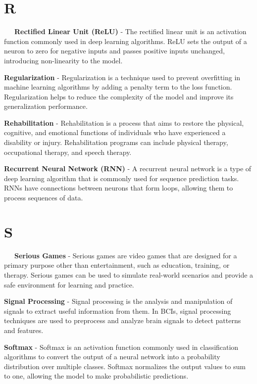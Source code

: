 \section*{R}

\-\ \-\ \-\ \textbf{Rectified Linear Unit (ReLU)} - The rectified linear unit is an activation function commonly used in deep learning algorithms. ReLU sets the output of a neuron to zero for negative inputs and passes positive inputs unchanged, introducing non-linearity to the model.

\textbf{Regularization} - Regularization is a technique used to prevent overfitting in machine learning algorithms by adding a penalty term to the loss function. Regularization helps to reduce the complexity of the model and improve its generalization performance.

\textbf{Rehabilitation} - Rehabilitation is a process that aims to restore the physical, cognitive, and emotional functions of individuals who have experienced a disability or injury. Rehabilitation programs can include physical therapy, occupational therapy, and speech therapy.

\textbf{Recurrent Neural Network (RNN)} - A recurrent neural network is a type of deep learning algorithm that is commonly used for sequence prediction tasks. RNNs have connections between neurons that form loops, allowing them to process sequences of data.

\section*{S}

\-\ \-\ \-\ \textbf{Serious Games} - Serious games are video games that are designed for a primary purpose other than entertainment, such as education, training, or therapy. Serious games can be used to simulate real-world scenarios and provide a safe environment for learning and practice.

\textbf{Signal Processing} - Signal processing is the analysis and manipulation of signals to extract useful information from them. In BCIs, signal processing techniques are used to preprocess and analyze brain signals to detect patterns and features.

\textbf{Softmax} - Softmax is an activation function commonly used in classification algorithms to convert the output of a neural network into a probability distribution over multiple classes. Softmax normalizes the output values to sum to one, allowing the model to make probabilistic predictions.

